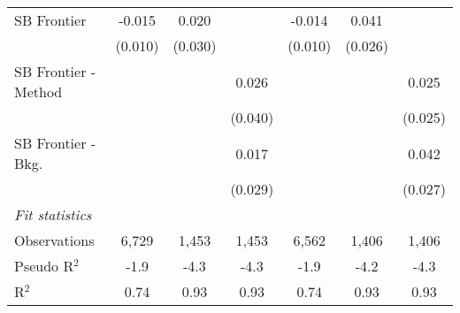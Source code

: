 \begin{tabular}{lcccccc}
   SB Frontier          & -0.015       & 0.020       &         & -0.014       & 0.041       &   \\   
                        & (0.010)      & (0.030)     &         & (0.010)      & (0.026)     &   \\   
   SB Frontier - Method &              &             & 0.026   &              &             & 0.025\\   
                        &              &             & (0.040) &              &             & (0.025)\\   
   SB Frontier - Bkg.   &              &             & 0.017   &              &             & 0.042\\   
                        &              &             & (0.029) &              &             & (0.027)\\   
   \midrule
   \emph{Fit statistics}\\
   Observations         & 6,729        & 1,453       & 1,453   & 6,562        & 1,406       & 1,406\\  
   Pseudo R$^2$         & -1.9         & -4.3        & -4.3    & -1.9         & -4.2        & -4.3\\  
   R$^2$                & 0.74         & 0.93        & 0.93    & 0.74         & 0.93        & 0.93\\  
   

\end{tabular}
